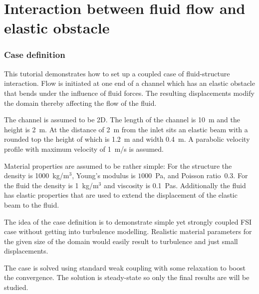 \chapter{Interaction between fluid flow and elastic obstacle}



\subsection*{Case definition}
 

This tutorial demonstrates how to set up a coupled case
of fluid-structure interaction. Flow is 
initiated at one end of a channel which has an elastic obstacle
that bends under the influence of fluid forces. The resulting displacements 
modify the domain thereby affecting the flow of the fluid.



The channel is assumed to be 2D. The length of the channel is 10~m and the height 
is 2~m. At the distance of 2~m from the inlet sits an elastic beam with a rounded top the height of which is
1.2~m and width 0.4~m. A parabolic velocity profile with maximum velocity
of 1~m/s is assumed.  

Material properties are assumed to be rather simple:
For the structure the density is 
1000~kg/m$^3$, Young's modulus is $1000$~Pa, and Poisson ratio~0.3. For the 
fluid the density is 1~kg/m$^3$ and viscosity is 0.1~Pas. Additionally the 
fluid has elastic properties that are used to extend the displacement 
of the elastic beam to the fluid. 

The idea of the case definition is to 
demonstrate simple yet strongly coupled FSI case without getting into turbulence modelling. Realistic 
material parameters for the given size of the domain would easily result to turbulence and just small 
displacements.

The case is solved using standard weak coupling with some relaxation to
boost the convergence. The solution is steady-state so 
only the final results are will be studied. 



